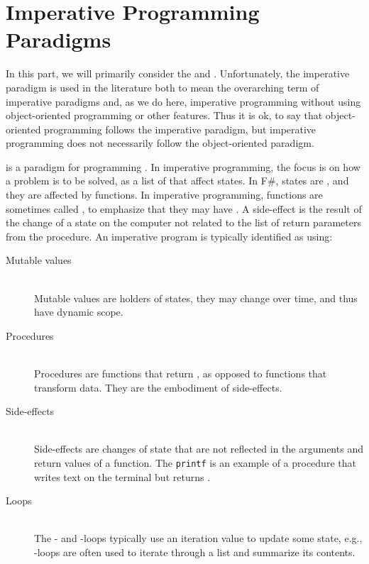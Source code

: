 \documentclass[fsharpNotes.tex]{subfiles}
\begin{document}
\part{Imperative Programming Paradigms}
\label{part:imperative}
In this part, we will primarily consider the  and . Unfortunately, the imperative paradigm is used in the literature both to mean the overarching term of imperative paradigms and, as we do here, imperative programming without using object-oriented programming or other features. Thus it is ok, to say that object-oriented programming follows the imperative paradigm, but imperative programming does not necessarily follow the object-oriented paradigm.

 is a paradigm for programming . In imperative programming, the focus is on how a problem is to be solved, as a list of  that affect states. In F\#, states are , and they are affected by functions. In imperative programming, functions are sometimes called , to emphasize that they may have . A side-effect is the result of the change of a state on the computer not related to the list of return parameters from the procedure. An imperative program is typically identified as using:
\begin{description}
\item[Mutable values]~\\
  Mutable values are holders of states, they may change over time, and thus have dynamic scope.
\item[Procedures]~\\
  Procedures are functions that return \lexeme{()}, as opposed to functions that transform data. They are the embodiment of side-effects.
\item[Side-effects]~\\
  Side-effects are changes of state that are not reflected in the arguments and return values of a function. The \lstinline{printf} is an example of a procedure that writes text on the terminal but returns \lexeme{()}.
\item[Loops]~\\
  The - and -loops typically use an iteration value to update some state, e.g., -loops are often used to iterate through a list and summarize its contents.
\end{description}
\end{document}
